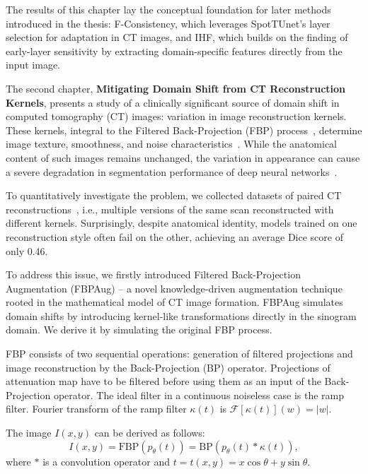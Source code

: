 The results of this chapter lay the conceptual foundation for later methods introduced in the thesis: F-Consistency, which leverages SpotTUnet’s layer selection for adaptation in CT images, and IHF, which builds on the finding of early-layer sensitivity by extracting domain-specific features directly from the input image.




The second chapter, \textbf{Mitigating Domain Shift from CT Reconstruction Kernels}, presents a study of a clinically significant source of domain shift in computed tomography (CT) images: variation in image reconstruction kernels. These kernels, integral to the Filtered Back-Projection (FBP) process~\cite{schofield2020image}, determine image texture, smoothness, and noise characteristics~\cite{schaller2003spatial}. While the anatomical content of such images remains unchanged, the variation in appearance can cause a severe degradation in segmentation performance of deep neural networks~\cite{choe2019deep,lee2019ct}.

To quantitatively investigate the problem, we collected datasets of paired CT reconstructions~\cite{morozov2020mosmeddata,tsai2021rsna}, i.e., multiple versions of the same scan reconstructed with different kernels. Surprisingly, despite anatomical identity, models trained on one reconstruction style often fail on the other, achieving an average Dice score of only 0.46.

To address this issue, we firstly introduced Filtered Back-Projection Augmentation (FBPAug) -- a novel knowledge-driven augmentation technique rooted in the mathematical model of CT image formation. FBPAug simulates domain shifts by introducing kernel-like transformations directly in the sinogram domain. We derive it by simulating the original FBP process.

FBP consists of two sequential operations: generation of filtered projections and image reconstruction by the Back-Projection (BP) operator. Projections of attenuation map have to be filtered before using them as an input of the Back-Projection operator. The ideal filter in a continuous noiseless case is the ramp filter. Fourier transform of the ramp filter $\kappa(t)$ is $\mathcal{F}[\kappa(t)](w) = |w|$.

The image $I(x, y)$ can be derived as follows:
\begin{equation}
	\label{eqn:main_eq}
	I(x, y) = \text{FBP}(p_\theta(t)) = \text{BP}(p_\theta(t) * \kappa(t)),
\end{equation}
where $*$ is a convolution operator and $t = t(x,y) = x\cos\theta + y\sin\theta$.%

